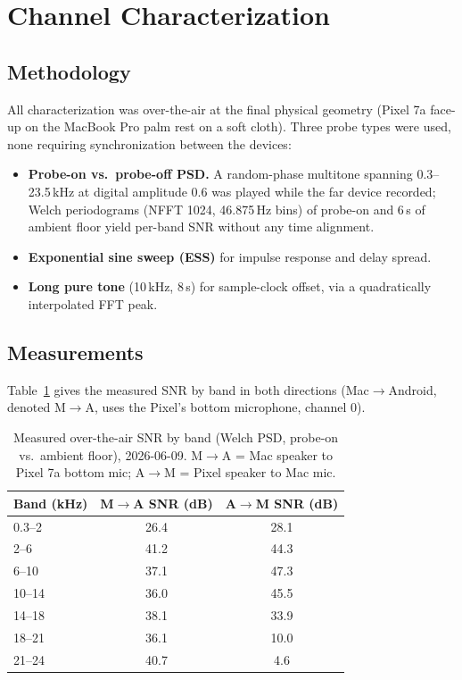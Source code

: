 \documentclass[11pt]{article}
\begin{document}
\section{Channel Characterization}
\label{sec:channel}

\subsection{Methodology}

All characterization was over-the-air at the final physical geometry (Pixel 7a
face-up on the MacBook Pro palm rest on a soft cloth). Three probe types were
used, none requiring synchronization between the devices:

\begin{itemize}
  \item \textbf{Probe-on vs.\ probe-off PSD.} A random-phase multitone
        spanning 0.3--23.5\,kHz at digital amplitude 0.6 was played while the
        far device recorded; Welch periodograms (NFFT 1024, 46.875\,Hz bins)
        of probe-on and 6\,s of ambient floor yield per-band SNR without any
        time alignment.
  \item \textbf{Exponential sine sweep (ESS)} for impulse response and delay
        spread.
  \item \textbf{Long pure tone} (10\,kHz, 8\,s) for sample-clock offset, via a
        quadratically interpolated FFT peak.
\end{itemize}

\subsection{Measurements}

Table~\ref{tab:snr} gives the measured SNR by band in both directions
(Mac$\rightarrow$Android, denoted M$\rightarrow$A, uses the Pixel's bottom
microphone, channel 0).

\begin{table}[t]
\centering
\caption{Measured over-the-air SNR by band (Welch PSD, probe-on vs.\ ambient
floor), 2026-06-09. M$\rightarrow$A = Mac speaker to Pixel 7a bottom mic;
A$\rightarrow$M = Pixel speaker to Mac mic.}
\label{tab:snr}
\begin{tabular}{lcc}
\toprule
Band (kHz) & M$\rightarrow$A SNR (dB) & A$\rightarrow$M SNR (dB) \\
\midrule
0.3--2   & 26.4 & 28.1 \\
2--6     & 41.2 & 44.3 \\
6--10    & 37.1 & 47.3 \\
10--14   & 36.0 & 45.5 \\
14--18   & 38.1 & 33.9 \\
18--21   & 36.1 & 10.0 \\
21--24   & 40.7 & \phantom{0}4.6 \\
\bottomrule
\end{tabular}
\end{table}
\end{document}
